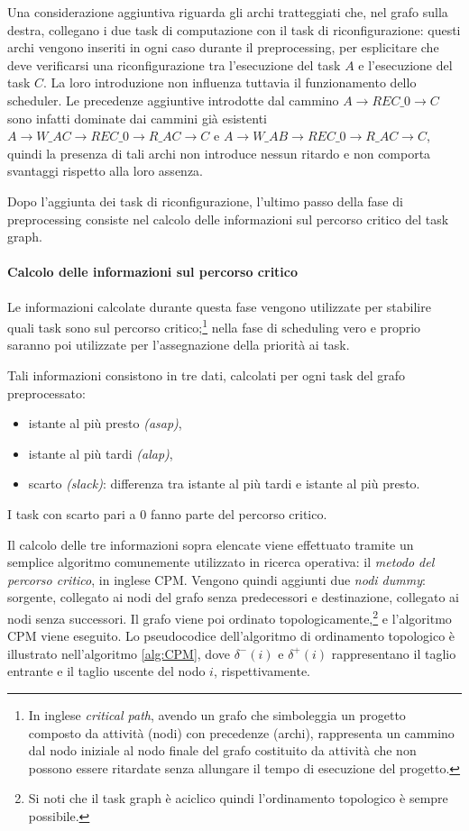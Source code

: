 Una considerazione 
aggiuntiva riguarda gli archi tratteggiati che, nel grafo sulla destra, 
collegano i due task di computazione con il task di riconfigurazione: questi 
archi vengono inseriti in ogni caso durante il preprocessing, per esplicitare 
che deve verificarsi una riconfigurazione tra l'esecuzione del task $A$ e 
l'esecuzione del task $C$. La loro introduzione non influenza tuttavia il 
funzionamento dello scheduler. Le precedenze aggiuntive introdotte dal cammino 
$A \rightarrow REC\_0 \rightarrow C$ sono infatti dominate dai cammini già 
esistenti $A \rightarrow W\_AC \rightarrow REC\_0 \rightarrow R\_AC \rightarrow 
C$ e $A \rightarrow W\_AB \rightarrow REC\_0 \rightarrow R\_AC \rightarrow C$, 
quindi la presenza di tali archi non introduce nessun ritardo e non comporta 
svantaggi rispetto alla loro assenza.

Dopo l'aggiunta dei task di riconfigurazione, l'ultimo passo della fase di 
preprocessing consiste nel calcolo delle informazioni sul percorso critico del 
task graph.


\paragraph{Calcolo delle informazioni sul percorso critico}
\label{par:percorsoCritico}
Le informazioni calcolate durante questa fase vengono utilizzate per stabilire 
quali task sono sul percorso critico;\footnote{In inglese \emph{critical path}, 
avendo un grafo che simboleggia un progetto composto da attività (nodi) con 
precedenze (archi), rappresenta un cammino dal nodo iniziale al nodo finale del 
grafo costituito da attività che non possono essere ritardate senza allungare 
il tempo di esecuzione del progetto.} nella fase di scheduling vero e proprio
saranno poi utilizzate per l'assegnazione della priorità ai task.

Tali informazioni consistono in tre dati, calcolati per ogni task del grafo 
preprocessato:
\begin{itemize}
 \item istante al più presto \emph{(asap)},
 \item istante al più tardi \emph{(alap)},
 \item scarto \emph{(slack)}: differenza tra istante al più tardi e istante al 
più presto.
\end{itemize}
I task con scarto pari a $0$ fanno parte del percorso critico.

Il calcolo delle tre informazioni sopra elencate viene effettuato tramite un 
semplice algoritmo comunemente utilizzato in ricerca operativa: il \emph{metodo
del percorso critico}, in inglese \ac{CPM}.
Vengono quindi aggiunti due \emph{nodi dummy}: sorgente, collegato ai nodi del 
grafo senza predecessori e destinazione, collegato ai nodi senza successori.
Il grafo viene poi ordinato topologicamente,\footnote{Si noti che il task graph 
è aciclico quindi l'ordinamento topologico è sempre possibile.} e l'algoritmo 
\ac{CPM} viene eseguito. Lo pseudocodice dell'algoritmo di ordinamento 
topologico è illustrato nell'algoritmo \ref{alg:CPM}, dove $\delta^-(i)$ e 
$\delta^+(i)$ rappresentano il taglio entrante e il taglio uscente del nodo 
$i$, rispettivamente.

